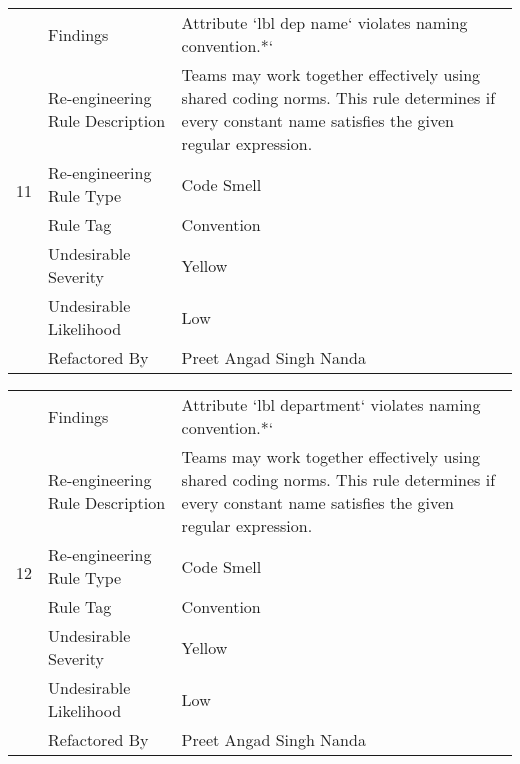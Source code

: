 \documentclass[12pt,english]{article}
\begin{document}
\begin{table}[!ht]
    \begin{tabularx}{\textwidth}{|c|l|X|}
    \hline
        \multirow{7}{*}{11} & Findings & Attribute ‘lbl dep name‘ violates naming convention.*‘ \\ \cline{2-3}
        & Re-engineering Rule Description & Teams may work together effectively using shared coding norms. This rule determines if every constant name satisfies the given regular expression.
 \\ \cline{2-3}
        & Re-engineering Rule Type & Code Smell \\ \cline{2-3}
        & Rule Tag & Convention \\ \cline{2-3}
        & Undesirable Severity & Yellow \\ \cline{2-3}
        & Undesirable Likelihood & Low \\ \cline{2-3}
        & Refactored By & Preet Angad Singh Nanda \\ \hline
    \end{tabularx}
\end{table}

\begin{table}[!ht]
    \begin{tabularx}{\textwidth}{|c|l|X|}
    \hline
        \multirow{7}{*}{12} & Findings & Attribute ‘lbl department‘ violates naming convention.*‘ \\ \cline{2-3}
        & Re-engineering Rule Description & Teams may work together effectively using shared coding norms. This rule determines if every constant name satisfies the given regular expression.
 \\ \cline{2-3}
        & Re-engineering Rule Type & Code Smell \\ \cline{2-3}
        & Rule Tag & Convention \\ \cline{2-3}
        & Undesirable Severity & Yellow \\ \cline{2-3}
        & Undesirable Likelihood & Low \\ \cline{2-3}
        & Refactored By & Preet Angad Singh Nanda \\ \hline
    \end{tabularx}
\end{table}
\end{document}
